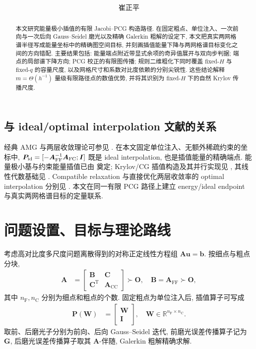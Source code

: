 \documentclass{ctexart}
\title{\textbf{\reporttitle}}
\author{崔正平}
\date{}
\newcommand{\q}{\quad}
\newcommand{\T}{\mathrm{T}}
\newcommand{\R}{\mathbb{R}}
\let\originalmaketitle\maketitle
\renewcommand{\maketitle}{\originalmaketitle\thispagestyle{fancy}}
\begin{document}
\maketitle

\begin{abstract}
本文研究能量极小插值的有限 Jacobi--PCG 构造路径. 在固定粗点、单位注入、一次前向与一次后向 Gauss--Seidel 磨光以及精确 Galerkin 粗解的设定下, 本文把真实两网格谱半径写成能量坐标中的精确图空间目标, 并刻画插值能量下降与两网格谱目标变化之间的方向错配. 主要结果包括: 能量端点附近带显式余项的奇异值展开与双向步判据; 端点的局部谱下降方向; PCG 校正的有限图传播; 规则二维粗化下同时覆盖 fixed-$H$ 与 fixed-$q$ 的容量尺度, 以及网格尺寸和系数对比度依赖的分别尖锐性. 这些结论解释 $m=\Theta(h^{-1})$ 量级有限路径点的数值优势, 并将其识别为 fixed-$H$ 下的自然 Krylov 传播尺度.
\end{abstract}

\subsection*{与 ideal/optimal interpolation 文献的关系}
经典 AMG 与两层收敛理论可参见
\cite{ruge1987amg,trottenberg2001multigrid,falgout2005twogrid,xu2017amg}.
在本文固定单位注入、无额外稀疏约束的坐标中,
$\bm P_{\rm id}=[-\bm A_{\rm FF}^{-1}\bm A_{\rm FC};\bm I]$
既是 ideal interpolation, 也是插值能量的精确端点. 能量极小基与约束能量插值已由
\cite{mandel1999energy,wan2000energy,kolev2006energy,brannick2007energy}
奠定; Krylov/CG 插值构造及其并行实现见
\cite{olson2011energy,janna2023parallel}, 其线性代数基础见
\cite{hestenes1952cg,saad2003iterative}. Compatible relaxation 与直接优化两层收敛率的 optimal interpolation 分别见
\cite{brannick2010compatible,brannick2018optimal}. 本文在同一有限 PCG 路径上建立 energy/ideal endpoint 与真实两网格谱目标的定量联系.

\section{问题设置、目标与理论路线}
\label{sec:setup}

考虑高对比度多尺度问题离散得到的对称正定线性方程组 $\bm A\bm u=\bm b$. 按细点与粗点分块,
\begin{align}
    \bm A&=\begin{bmatrix}
        \bm B & \bm C\\
        \bm C^\T & \bm A_{\mathrm{CC}}
    \end{bmatrix}\succ \mathbf{O},\q \bm B=\bm A_{\mathrm{FF}}\succ \mathbf{O},
    \label{eq:setup-block-A}
\end{align}
其中 $n_{\mathrm{F}},n_{\mathrm{C}}$ 分别为细点和粗点的个数. 固定粗点为单位注入后, 插值算子可写成
\begin{align}
    \bm P(\bm W)&=\begin{bmatrix}
        \bm W\\
        \bm I
    \end{bmatrix},\q \bm W\in\R^{n_{\mathrm{F}}\times n_{\mathrm{C}}}.
    \label{eq:setup-interpolation}
\end{align}
取前、后磨光子分别为前向、后向 Gauss--Seidel 迭代, 前磨光误差传播算子记为 $\bm G$, 后磨光误差传播算子取其 $\bm A$-伴随, Galerkin 粗解精确求解.
\end{document}

